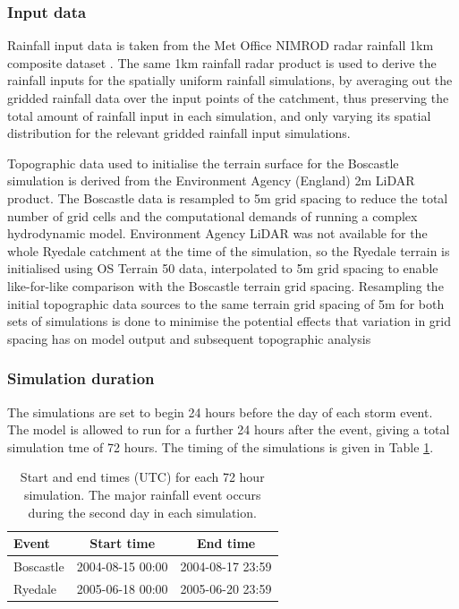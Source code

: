 \subsubsection{Input data}
Rainfall input data is taken from the Met Office NIMROD radar rainfall 1km composite dataset \citep{metoffice2003nimrod}. The same 1km rainfall radar product is used to derive the rainfall inputs for the spatially uniform rainfall simulations, by averaging out the gridded rainfall data over the input points of the catchment, thus preserving the total amount of rainfall input in each simulation, and only varying its spatial distribution for the relevant gridded rainfall input simulations.

Topographic data used to initialise the terrain surface for the Boscastle simulation is derived from the Environment Agency (England) 2m LiDAR product. The Boscastle data is resampled to 5m grid spacing to reduce the total number of grid cells and the  computational demands of running a complex hydrodynamic model. Environment Agency LiDAR was not available for the whole Ryedale catchment at the time of the simulation, so the Ryedale terrain is initialised using OS Terrain 50 data, interpolated to 5m grid spacing to enable like-for-like comparison with the Boscastle terrain grid spacing. Resampling the initial topographic data sources to the same terrain grid spacing of 5m for both sets of simulations is done to minimise the potential effects that variation in grid spacing has on model output and subsequent topographic analysis \citep[e.g][]{chang1991effect,schoorl2000three,haile2005effects,zhang2008effects}

\subsubsection{Simulation duration}

The simulations are set to begin 24 hours before the day of each storm event. The model is allowed to run for a further 24 hours after the event, giving a total simulation tme of 72 hours. The timing of the simulations is given in Table \ref{table_start_time_hydrog_sims}.

\begin{table}[htbp]
\begin{tabular}{l c  c}
\textbf{Event}  &   \textbf{Start time} &  \textbf{End time} \\
\hline 
Boscastle          &  2004-08-15 00:00  &  2004-08-17 23:59 \\
Ryedale             &  2005-06-18 00:00  &  2005-06-20 23:59 \\
\hline

\end{tabular}
\caption{Start and end times (UTC) for each 72 hour simulation. The major rainfall event occurs during the second day in each simulation.}
\label{table_start_time_hydrog_sims}
\end{table}

